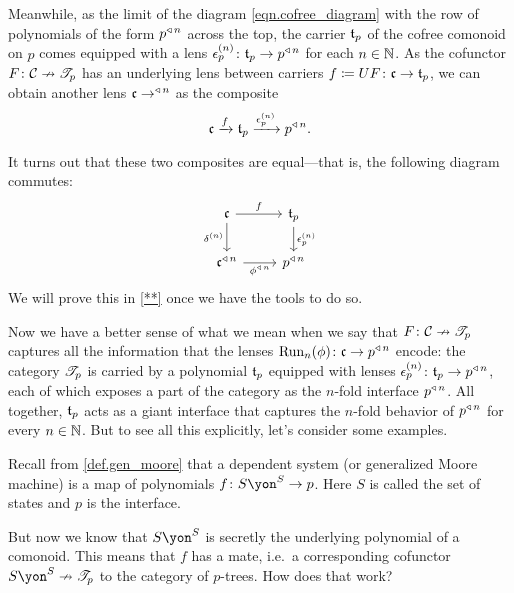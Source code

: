 \documentclass[Book-Poly]{subfiles}
\begin{document}
Meanwhile, as the limit of the diagram \eqref{eqn.cofree_diagram} with the row of polynomials of the form $p^{\mathbin{\triangleleft}\,n}$ across the top, the carrier $\mathfrak{t}_p$ of the cofree comonoid on $p$ comes equipped with a lens $\epsilon^{(n)}_p\colon\mathfrak{t}_p\to p^{\mathbin{\triangleleft}\,n}$ for each $n\in\mathbb{N}$.
As the cofunctor $F\colon\mathcal{C}\nrightarrow\mathscr{T}_{p}$ has an underlying lens between carriers $f\coloneqq UF\colon\mathfrak{c}\to\mathfrak{t}_p$, we can obtain another lens $\mathfrak{c}\to^{\mathbin{\triangleleft}\,n}$ as the composite
\[
    \mathfrak{c}\xrightarrow{f}\mathfrak{t}_p\xrightarrow{\epsilon^{(n)}_p}p^{\mathbin{\triangleleft}\,n}.
\]

It turns out that these two composites are equal---that is, the following diagram commutes:
\[
\begin{tikzcd}
    \ema{c} \ar[r,"f"] \ar[d, "\delta^{(n)}"'] & \ema{t}_p \ar[d, "\epsilon^{(n)}_p"] \\
    \ema{c}\tripow{n} \ar[r, "\phi\tripow{n}"'] & p\tripow{n}
\end{tikzcd}
\]
We will prove this in \cref{**} once we have the tools to do so.

Now we have a better sense of what we mean when we say that $F\colon\mathcal{C}\nrightarrow\mathscr{T}_{p}$ captures all the information that the lenses $\text{Run}_n(\phi)\colon\mathfrak{c}\to p^{\mathbin{\triangleleft}\,n}$ encode: the category $\mathscr{T}_{p}$ is carried by a polynomial $\mathfrak{t}_p$ equipped with lenses $\epsilon^{(n)}_p\colon\mathfrak{t}_p\to p^{\mathbin{\triangleleft}\,n}$, each of which exposes a part of the category as the $n$-fold interface $p^{\mathbin{\triangleleft}\,n}$.
All together, $\mathfrak{t}_p$ acts as a giant interface that captures the $n$-fold behavior of $p^{\mathbin{\triangleleft}\,n}$ for every $n\in\mathbb{N}$.
But to see all this explicitly, let's consider some examples.


Recall from \cref{def.gen_moore} that a dependent system (or generalized Moore machine) is a map of polynomials $f\colon S\yon^S\to p$. Here $S$ is called the set of states and $p$ is the interface. 

But now we know that $S\yon^S$ is secretly the underlying polynomial of a comonoid. This means that $f$ has a mate, i.e.\ a corresponding cofunctor $S\yon^S\cof\cofree{p}$ to the category of $p$-trees. How does that work?
\end{document}
